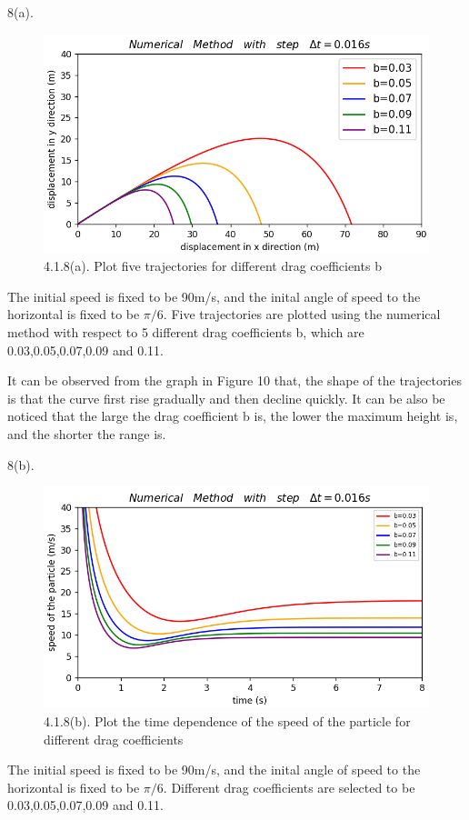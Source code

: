 \documentclass{book}
\begin{document}
\vspace{0.01\textheight}
{\Large 8(a).}
\begin{figure}[H]
  \centering
  \includegraphics[scale=0.6]{./graphs/project4.1.8(a).png}
  \caption{4.1.8(a). Plot five trajectories for different drag coefficients b}
\end{figure}
The initial speed is fixed to be 90m/s, and the inital angle of speed to the horizontal is fixed to be {$\pi/6$}.
Five trajectories are plotted using the numerical method with respect to 5 different drag coefficients b, which are 0.03,0.05,0.07,0.09 and 0.11.

It can be observed from the graph in Figure 10 that, the shape of the trajectories is that the curve first rise gradually and then decline quickly.
It can be also be noticed that the large the drag coefficient b is, the lower the maximum height is, and the shorter the range is.

\vspace{0.01\textheight}
{\Large 8(b).}
\begin{figure}[H]
  \centering
  \includegraphics[scale=0.4]{./graphs/project4.1.8(b).png}
  \caption{4.1.8(b). Plot the time dependence of the speed of the particle for different drag coefficients}
\end{figure}
The initial speed is fixed to be 90m/s, and the inital angle of speed to the horizontal is fixed to be {$\pi/6$}.
Different drag coefficients are selected to be 0.03,0.05,0.07,0.09 and 0.11.
\end{document}

